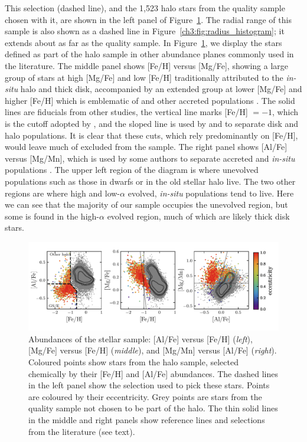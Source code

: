 This selection (dashed line), and the 1,523 halo stars from the quality sample chosen with it, are shown in the left panel of Figure~\ref{ch3:fig:halo_abundances}. The radial range of this sample is also shown as a dashed line in Figure~\ref{ch3:fig:radius_histogram}; it extends about as far as the quality sample. In Figure~\ref{ch3:fig:halo_abundances}, we display the stars defined as part of the halo sample in other abundance planes commonly used in the literature. The middle panel shows [Fe/H] versus [Mg/Fe], showing a large group of stars at high [Mg/Fe] and low [Fe/H] traditionally attributed to the \textit{in-situ} halo and thick disk, accompanied by an extended group at lower [Mg/Fe] and higher [Fe/H] which is emblematic of \gse and other accreted populations \parencite[e.g.][]{hasselquist21,horta23a}. The solid lines are fiducials from other studies, the vertical line marks [Fe/H] $= -1$, which is the cutoff adopted by \cite{mackereth20}, and the sloped line is used by \textcite{mackereth19a} and \cite{lane22} to separate disk and halo populations. It is clear that these cuts, which rely predominantly on [Fe/H], would leave much of \gse excluded from the sample. The right panel shows [Al/Fe] versus [Mg/Mn], which is used by some authors to separate accreted and \textit{in-situ} populations \parencite[e.g.][]{das20,horta21a,fernandez23}. The upper left region of the diagram is where unevolved populations such as those in dwarfs or in the old stellar halo live. The two other regions are where high and low-$\alpha$ evolved, \textit{in-situ} populations tend to live. Here we can see that the majority of our sample occupies the unevolved region, but some is found in the high-$\alpha$ evolved region, much of which are likely thick disk stars.

\begin{figure}
    \centering
    \includegraphics[width=\textwidth]{figure/ch3/halo_abundances.pdf}
    \caption{Abundances of the stellar sample: [Al/Fe] versus [Fe/H] (\textit{left}), [Mg/Fe] versus [Fe/H] (\textit{middle}), and [Mg/Mn] versus [Al/Fe] (\textit{right}). Coloured points show stars from the halo sample, selected chemically by their [Fe/H] and [Al/Fe] abundances. The dashed lines in the left panel show the selection used to pick these stars. Points are coloured by their eccentricity. Grey points are stars from the quality sample not chosen to be part of the halo. The thin solid lines in the middle and right panels show reference lines and selections from the literature (see text).}
    \label{ch3:fig:halo_abundances}
\end{figure}


